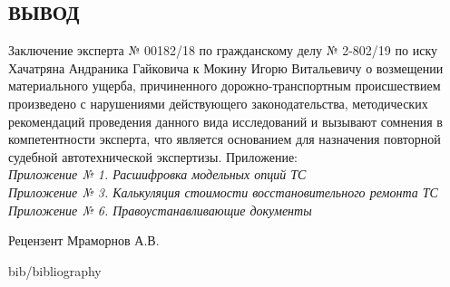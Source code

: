 \subsection{ ВЫВОД}

Заключение эксперта № 00182/18 по гражданскому делу № 2-802/19 по иску Хачатряна Андраника Гайковича к Мокину Игорю Витальевичу о возмещении материального ущерба, причиненного дорожно-транспортным происшествием произведено с нарушениями действующего законодательства, методических рекомендаций проведения данного вида исследований и вызывают сомнения в компетентности эксперта,  что является основанием для назначения повторной судебной автотехнической экспертизы.\textbf{}
\vspace{7mm}
\relax
Приложение:\\
\vspace{3mm}
\textit{\small 
\noindent	Приложение № 1. Расшифровка модельных опций ТС  \\
	Приложение № 3. Калькуляция стоимости восстановительного ремонта ТС \\
	Приложение № 6. Правоустанавливающие документы\\}


\vspace{15mm}


\noindent Рецензент \hfill  \underbar{ }Мраморнов А.В.

\vspace{20mm}

 {bib/bibliography}

%
%
%
